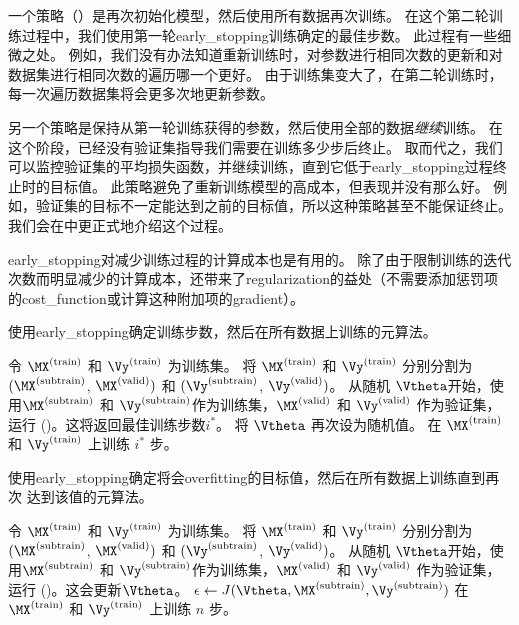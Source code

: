 
一个策略（）是再次初始化模型，然后使用所有数据再次训练。
在这个第二轮训练过程中，我们使用第一轮\gls{early_stopping}训练确定的最佳步数。
此过程有一些细微之处。
例如，我们没有办法知道重新训练时，对参数进行相同次数的更新和对数据集进行相同次数的遍历哪一个更好。
由于训练集变大了，在第二轮训练时，每一次遍历数据集将会更多次地更新参数。

另一个策略是保持从第一轮训练获得的参数，然后使用全部的数据\emph{继续}训练。
在这个阶段，已经没有验证集指导我们需要在训练多少步后终止。
取而代之，我们可以监控验证集的平均损失函数，并继续训练，直到它低于\gls{early_stopping}过程终止时的目标值。
此策略避免了重新训练模型的高成本，但表现并没有那么好。
例如，验证集的目标不一定能达到之前的目标值，所以这种策略甚至不能保证终止。
我们会在中更正式地介绍这个过程。

\gls{early_stopping}对减少训练过程的计算成本也是有用的。
除了由于限制训练的迭代次数而明显减少的计算成本，还带来了\gls{regularization}的益处（不需要添加惩罚项的\gls{cost_function}或计算这种附加项的\gls{gradient}）。

\begin{algorithm}[ht]
\caption{使用\gls{early_stopping}确定训练步数，然后在所有数据上训练的元算法。
}
\label{alg:early_stopping_retrain}
\begin{algorithmic}
\STATE 令 $\MX^{(\text{train})}$ 和 $\Vy^{(\text{train})}$ 为训练集。
\STATE 将 $\MX^{(\text{train})}$ 和 $\Vy^{(\text{train})}$ 分别分割为 $(\MX^{(\text{subtrain})}$, $\MX^{(\text{valid})})$ 和 $(\Vy^{(\text{subtrain})}$, $\Vy^{(\text{valid})})$。
\STATE 从随机 $\Vtheta$开始，使用$\MX^{(\text{subtrain})}$ 和 $\Vy^{(\text{subtrain})}$作为训练集，$\MX^{(\text{valid})}$ 和 $\Vy^{(\text{valid})}$ 作为验证集，运行 ()。这将返回最佳训练步数$i^*$。
\STATE 将 $\Vtheta$ 再次设为随机值。
\STATE 在 $\MX^{(\text{train})}$ 和 $\Vy^{(\text{train})}$ 上训练 $i^*$ 步。  
\end{algorithmic}
\end{algorithm}

\begin{algorithm}[ht]
\caption{
使用\gls{early_stopping}确定将会\gls{overfitting}的目标值，然后在所有数据上训练直到再次
达到该值的元算法。
}
\label{alg:early_stopping_continue}
\begin{algorithmic}
\STATE 令 $\MX^{(\text{train})}$ 和 $\Vy^{(\text{train})}$ 为训练集。
\STATE 将 $\MX^{(\text{train})}$ 和 $\Vy^{(\text{train})}$ 分别分割为 $(\MX^{(\text{subtrain})}$, $\MX^{(\text{valid})})$ 和 $(\Vy^{(\text{subtrain})}$, $\Vy^{(\text{valid})})$。
\STATE 从随机 $\Vtheta$开始，使用$\MX^{(\text{subtrain})}$ 和 $\Vy^{(\text{subtrain})}$作为训练集，$\MX^{(\text{valid})}$ 和 $\Vy^{(\text{valid})}$ 作为验证集，运行 ()。这会更新$\Vtheta$。
\STATE $\epsilon \leftarrow J(\Vtheta, \MX^{(\text{subtrain})},\Vy^{(\text{subtrain})})$
\STATE 在 $\MX^{(\text{train})}$ 和 $\Vy^{(\text{train})}$ 上训练 $n$ 步。  
\ENDWHILE
\end{algorithmic}
\end{algorithm}


